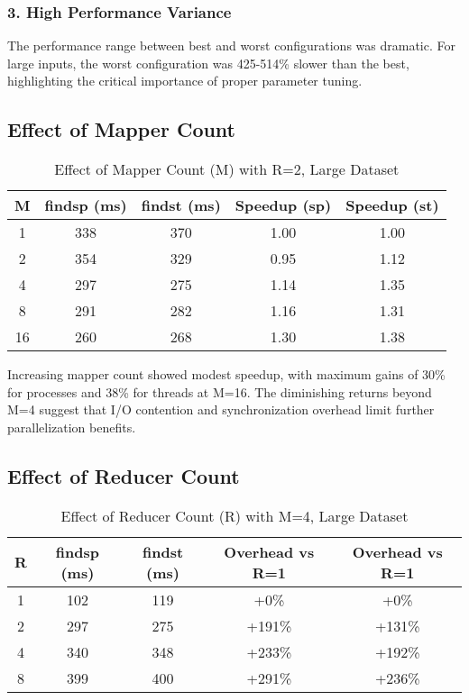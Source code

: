 \documentclass[11pt]{article}
\begin{document}
\subsubsection{3. High Performance Variance}
The performance range between best and worst configurations was dramatic. For large inputs, the worst configuration was 425-514\% slower than the best, highlighting the critical importance of proper parameter tuning.

\subsection{Effect of Mapper Count}

\begin{table}[H]
\centering
\caption{Effect of Mapper Count (M) with R=2, Large Dataset}
\begin{tabular}{ccccc}
\toprule
M & findsp (ms) & findst (ms) & Speedup (sp) & Speedup (st) \\
\midrule
1 & 338 & 370 & 1.00 & 1.00 \\
2 & 354 & 329 & 0.95 & 1.12 \\
4 & 297 & 275 & 1.14 & 1.35 \\
8 & 291 & 282 & 1.16 & 1.31 \\
16 & 260 & 268 & 1.30 & 1.38 \\
\bottomrule
\end{tabular}
\end{table}

Increasing mapper count showed modest speedup, with maximum gains of 30\% for processes and 38\% for threads at M=16. The diminishing returns beyond M=4 suggest that I/O contention and synchronization overhead limit further parallelization benefits.

\subsection{Effect of Reducer Count}

\begin{table}[H]
\centering
\caption{Effect of Reducer Count (R) with M=4, Large Dataset}
\begin{tabular}{ccccc}
\toprule
R & findsp (ms) & findst (ms) & Overhead vs R=1 & Overhead vs R=1 \\
\midrule
1 & 102 & 119 & +0\% & +0\% \\
2 & 297 & 275 & +191\% & +131\% \\
4 & 340 & 348 & +233\% & +192\% \\
8 & 399 & 400 & +291\% & +236\% \\
\bottomrule
\end{tabular}
\end{table}
\end{document}
